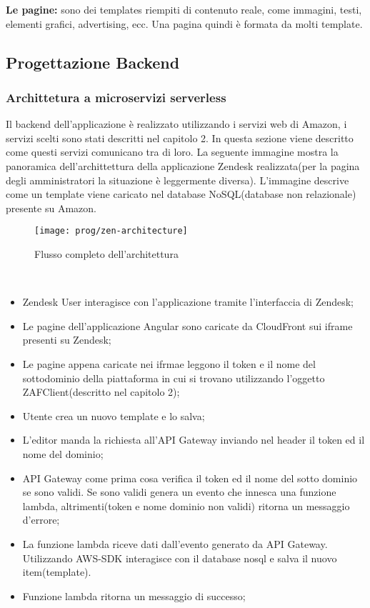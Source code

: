 \textbf{Le pagine:} sono dei templates riempiti di contenuto reale, come immagini, testi, elementi grafici, advertising, ecc. Una pagina quindi è formata da molti template. 
\newpage
\subsection{Progettazione Backend}
\subsubsection{Archittetura a microservizi serverless}
Il backend dell'applicazione è realizzato utilizzando i servizi web di Amazon, i servizi scelti sono stati descritti nel capitolo 2. In questa sezione viene descritto come questi servizi comunicano tra di loro. La seguente immagine mostra la panoramica dell'archittettura della applicazione Zendesk realizzata(per la pagina degli amministratori la situazione è leggermente diversa). L'immagine descrive come un template viene caricato nel database NoSQL(database non relazionale) presente su Amazon. 
\begin{figure}[!h] 
	\centering 
	\texttt{[image: prog/zen-architecture]} 
	\caption{Flusso completo dell'architettura}
\end{figure} 
\\
\begin{itemize}
	\item Zendesk User interagisce con l'applicazione tramite l'interfaccia di Zendesk;
	\item Le pagine dell'applicazione Angular sono caricate da CloudFront sui iframe presenti su Zendesk;
	\item Le pagine appena caricate nei ifrmae leggono il token e il nome del sottodominio della piattaforma in cui si trovano utilizzando l'oggetto ZAFClient(descritto nel capitolo 2);
	\item Utente crea un nuovo template e lo salva;
	\item L'editor manda la richiesta all'API Gateway inviando nel header il token ed il nome del dominio;
	\item API Gateway come prima cosa verifica il token ed il nome del sotto dominio se sono validi. Se sono validi genera un evento che innesca una funzione lambda, altrimenti(token e nome dominio non validi) ritorna un messaggio d'errore;
	\item La funzione lambda riceve dati dall'evento generato da API Gateway. Utilizzando AWS-SDK interagisce con il database nosql e salva il nuovo item(template).
	\item Funzione lambda ritorna un messaggio di successo;
\end{itemize}\newpage
